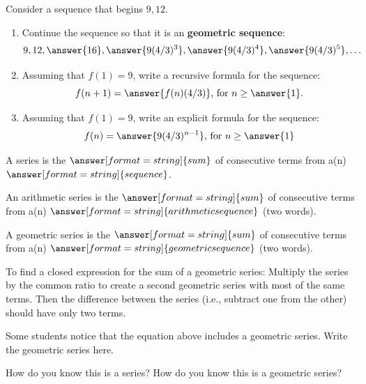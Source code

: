 \documentclass[handout,space,nooutcomes]{ximera}
\begin{document}
\begin{problem}
Consider a sequence that begins $9, 12$.    
\begin{enumerate}
\item Continue the sequence so that it is an \textbf{geometric sequence}:
\[
9, 12, \answer{16}, \answer{9(4/3)^3}, \answer{9(4/3)^4}, \answer{9(4/3)^5}, \dots
\]
\item Assuming that $f(1)=9$, write a recursive formula for the sequence:
\[
f(n+1)=\answer{f(n)(4/3)}\textrm{, for }n\ge\answer{1}.
\]
\item Assuming that $f(1)=9$, write an explicit formula for the sequence: 
\[
f(n)=\answer{9(4/3)^{n-1}}\textrm{, for }n\ge\answer{1}
\]
\end{enumerate}
\end{problem}


\begin{problem}
A series is the $\answer[format=string]{sum}$ of consecutive terms from a(n) $\answer[format=string]{sequence}$.  

An arithmetic series is the $\answer[format=string]{sum}$ of consecutive terms from a(n) $\answer[format=string]{arithmetic sequence}$ (two words).  

A geometric series is the $\answer[format=string]{sum}$ of consecutive terms from a(n) $\answer[format=string]{geometric sequence}$ (two words).  
\end{problem}




\begin{question}

To find a closed expression for the sum of a geometric series:  Multiply the series by the common ratio to create a second geometric series with most of the same terms.  Then the difference between the series (i.e., subtract one from the other) should have only two terms.  

\end{question}

\begin{question}
Some students notice that the equation above includes a geometric series.  Write the geometric series here.
\begin{freeResponse}
\end{freeResponse}
\end{question}

\begin{question}
How do you know this is a series?  How do you know this is a geometric series?   
\begin{freeResponse}
\end{freeResponse}
\end{question}
\end{document}
